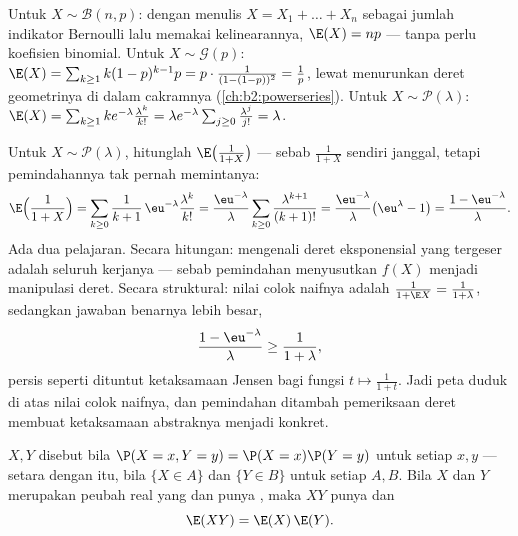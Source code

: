 \begin{example}\label{ex:b2:randomvar:expectations}
Untuk $X \sim \mathcal{B}(n, p)$: dengan menulis $X = X_1 + \dots + X_n$ sebagai
jumlah indikator Bernoulli lalu memakai kelinearannya, $\E(X) = np$ ---
tanpa perlu koefisien binomial. Untuk $X \sim \mathcal{G}(p)$: $\E(X) =
\sum_{k\geq1}k(1-p)^{k-1}p = p\cdot\frac{1}{(1 - (1-p))^2} =
\frac1p$, lewat menurunkan deret geometrinya di dalam cakramnya
(\cref{ch:b2:powerseries}). Untuk $X \sim \mathcal{P}(\lambda)$: $\E(X)
= \sum_{k\geq1}k e^{-\lambda}\frac{\lambda^k}{k!} = \lambda
e^{-\lambda}\sum_{j\geq0}\frac{\lambda^j}{j!} = \lambda$.
\end{example}

\begin{example}\label{ex:b2:randomvar:transferex}
Untuk $X \sim \mathcal P(\lambda)$, hitunglah
$\E\bigl(\frac1{1+X}\bigr)$ --- sebab  $\frac1{1+X}$
sendiri janggal, tetapi pemindahannya tak pernah memintanya:
\[
\E\Bigl(\frac1{1+X}\Bigr)
= \sum_{k\geq0}\frac{1}{k+1}\,\eu^{-\lambda}
\frac{\lambda^k}{k!}
= \frac{\eu^{-\lambda}}{\lambda}\sum_{k\geq0}
\frac{\lambda^{k+1}}{(k+1)!}
= \frac{\eu^{-\lambda}}{\lambda}\bigl(\eu^\lambda - 1\bigr)
= \frac{1 - \eu^{-\lambda}}{\lambda} .
\]
Ada dua pelajaran. Secara hitungan: mengenali deret eksponensial
yang tergeser adalah seluruh kerjanya --- sebab pemindahan menyusutkan
 $f(X)$ menjadi manipulasi deret. Secara struktural:
nilai colok naifnya adalah $\frac1{1 + \E X} =
\frac1{1 + \lambda}$, sedangkan jawaban benarnya lebih besar,
\[
\frac{1 - \eu^{-\lambda}}{\lambda} \geq
\frac{1}{1 + \lambda},
\]
persis seperti dituntut ketaksamaan Jensen bagi fungsi  $t
\mapsto \frac1{1+t}$. Jadi  peta
 duduk di atas nilai colok naifnya, dan pemindahan
ditambah pemeriksaan deret membuat ketaksamaan abstraknya menjadi konkret.
\end{example}

\begin{theorem}\label{thm:b2:randomvar:product}
 $X, Y$ disebut \emph{} bila $\P(X = x, Y =
y) = \P(X = x)\P(Y = y)$ untuk setiap $x, y$ --- setara dengan itu, bila
 $\{X \in A\}$ dan $\{Y \in B\}$  untuk setiap $A,
B$. Bila $X$ dan $Y$ merupakan peubah real yang  dan punya
, maka $XY$ punya  dan
\[
\E(XY) = \E(X)\,\E(Y) .
\]
\end{theorem}

